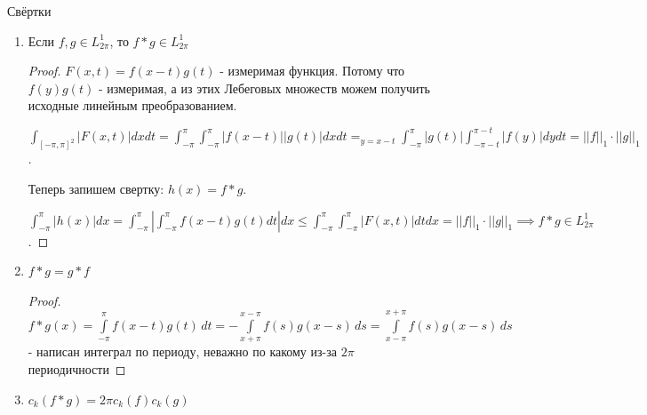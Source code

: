 \begin{properties}
    Свёртки
    \begin{enumerate}
        \item {
            Если $f, g \in L_{2\pi}^1$, то $f * g \in L_{2\pi}^1$

            \begin{proof}
                $F(x, t) = f(x - t)g(t)$ - измеримая функция. Потому что $f(y)g(t)$ - измеримая, а из этих Лебеговых множеств можем получить исходные линейным преобразованием.

                $\int_{[-\pi, \pi]^2} |F(x, t)| dx dt = \int_{-\pi}^{\pi} \int_{-\pi}^{\pi} | f(x - t) | |g(t)| dx dt =_{y = x - t} \int_{-\pi}^{\pi} |g(t)| \int_{-\pi - t}^{\pi - t} |f(y)| dy dt = ||f||_1 \cdot ||g||_1$.

                Теперь запишем свертку: $h(x) = f*g$.

                $\int_{-\pi}^{\pi} |h(x)| dx = \int_{-\pi}^{\pi} \left| \int_{-\pi}^{\pi} f(x-t) g(t) dt \right| dx \leq \int_{-\pi}^{\pi} \int_{-\pi}^{\pi} |F(x, t)| dt dx = ||f||_1 \cdot ||g||_1 \implies f * g \in L_{2\pi}^1$.

            \end{proof}
        }
        \item {
            $f * g = g * f$

            \begin{proof}
                $f * g (x) = \int\limits_{-\pi}^\pi f(x - t)g(t) \, dt = -\int\limits_{x+\pi}^{x-\pi} f(s) g(x - s) \, ds = \int\limits_{x-\pi}^{x+\pi} f(s) g(x - s) \, ds$ - написан интеграл по периоду, неважно по какому из-за $2\pi$ периодичности
            \end{proof}
        }
        \item {
            $c_k (f * g) = 2\pi c_k (f) c_k (g)$

}
\end{enumerate}
\end{properties}

